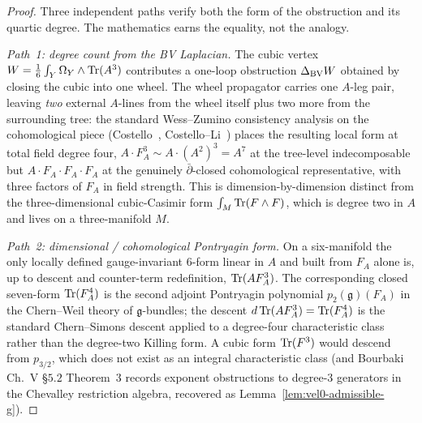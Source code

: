 \begin{proof}
Three independent paths verify both the form of the obstruction and
its quartic degree. The mathematics earns the equality, not the
analogy.

\smallskip
\emph{Path~1: degree count from the BV Laplacian.} The cubic vertex
$W = \tfrac{1}{6} \int_Y \Omega_Y \wedge \operatorname{Tr}(A^3)$ contributes a
one-loop obstruction $\Delta_{\mathrm{BV}} W$ obtained by closing the cubic
into one wheel. The wheel propagator carries one $A$-leg pair, leaving
\emph{two} external $A$-lines from the wheel itself plus two more from
the surrounding tree: the standard Wess--Zumino consistency analysis
on the cohomological piece (Costello~\cite{Costello2013},
Costello--Li~\cite{CostelloLi2020}) places the resulting local form at
total field degree four,
$A \cdot F_A^3 \sim A \cdot (A^2)^3 = A^7$ at the tree-level
indecomposable but $A \cdot F_A \cdot F_A \cdot F_A$ at the genuinely
$\bar{\partial}$-closed cohomological representative, with three
factors of $F_A$ in field strength. This is dimension-by-dimension
distinct from the three-dimensional cubic-Casimir form
$\int_M \operatorname{Tr}(F \wedge F)$, which is degree two in $A$ and lives on a
three-manifold $M$.

\smallskip
\emph{Path~2: dimensional / cohomological Pontryagin form.} On a
six-manifold the only locally defined gauge-invariant $6$-form linear
in $A$ and built from $F_A$ alone is, up to descent and counter-term
redefinition, $\operatorname{Tr}(A F_A^3)$. The corresponding closed seven-form
$\operatorname{Tr}(F_A^4)$ is the second adjoint Pontryagin polynomial
$p_2(\mathfrak{g})(F_A)$ in the Chern--Weil theory of
$\mathfrak{g}$-bundles; the descent
$d \operatorname{Tr}(A F_A^3) = \operatorname{Tr}(F_A^4)$
is the standard Chern--Simons descent applied to a degree-four
characteristic class rather than the degree-two Killing form. A cubic
form $\operatorname{Tr}(F^3)$ would descend from $p_{3/2}$, which does not exist as
an integral characteristic class (and Bourbaki Ch.~V
\S$5.2$ Theorem~$3$ records exponent obstructions to degree-$3$
generators in the Chevalley restriction algebra, recovered as
Lemma~\ref{lem:vel0-admissible-g}).


\end{proof}
